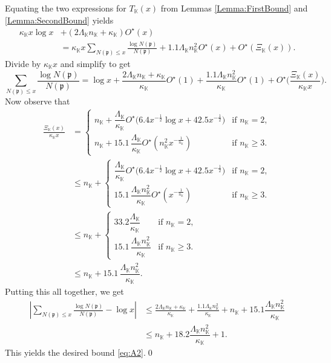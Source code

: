 \documentclass[10pt,reqno]{amsart}
\theoremstyle{plain}
\theoremstyle{definition}
\newcommand{\K}{\mathbb{K}}
\newcommand{\PP}{\mathfrak{p}}
\begin{document}
Equating the two expressions for $T_{\K}(x)$ from Lemmas \ref{Lemma:FirstBound} and \ref{Lemma:SecondBound} yields
\begin{align*}
\kappa_{\K} x\log x &+ (2\Lambda_{\K} n_{\K} +\kappa_{\K})O^{\star}(x)\\
&= \kappa_{\K} x \sum_{N(\PP)\leq x} \frac{\log{N(\PP)}}{N(\PP)} + 1.1 \Lambda_{\K}n_{\K}^2 
 O^{\star} (x) + O^{\star}(\Xi_{\K}(x)).
\end{align*}
Divide by $\kappa_{\K} x$ and simplify to get
\begin{equation*}
\sum_{N(\PP)\leq x} \frac{\log{N(\PP)}}{N(\PP)}
= \log x + \frac{2\Lambda_{\K} n_{\K} +\kappa_{\K}}{\kappa_{\K}}O^{\star}(1)
+ \frac{1.1 \Lambda_{\K}n_{\K}^2 
}{\kappa_{\K}} O^{\star} (1) + O^{\star}\bigg(\frac{\Xi_{\K}(x)}{\kappa_{\K}x}\bigg).
\end{equation*}
Now observe that
\begin{align*}
\frac{\Xi_{\K}(x)}{\kappa_{\K}x} 
&=
\begin{cases}
n_{\K}  + \dfrac{\Lambda_{\K}}{\kappa_{\K}} O^{\star} \big(6.4 x^{-\frac{1}{2}}\log x + 42.5 x^{ -\frac{1}{2} }   \big)  & \text{if $n_{\K} = 2$}, \\[5pt]
n_{\K}  + 15.1\, \dfrac{\Lambda_{\K}}{\kappa_{\K}} O^{\star}( n_{\K}^2 x^{ - \frac{1}{n_{\K}}}  )  & \text{if $n_{\K} \geq 3$}. 
\end{cases}
\\
&\leq n_{\K}+
\begin{cases}
\dfrac{\Lambda_{\K}}{\kappa_{\K}} O^{\star} \big(6.4 x^{-\frac{1}{2}}\log x + 42.5 x^{ -\frac{1}{2} }   \big)  & \text{if $n_{\K} = 2$}, \\[5pt]
15.1\, \dfrac{\Lambda_{\K} n_{\K}^2 }{\kappa_{\K}} O^{\star}( x^{ - \frac{1}{n_{\K}}}  )  & \text{if $n_{\K} \geq 3$}. 
\end{cases}
\\
&\leq n_{\K}+
\begin{cases}
33.2\dfrac{\Lambda_{\K}}{\kappa_{\K}}  & \text{if $n_{\K} = 2$}, \\[5pt]
15.1\, \dfrac{\Lambda_{\K}n_{\K}^2}{\kappa_{\K}}   & \text{if $n_{\K} \geq 3$}. 
\end{cases}
\\
&\leq n_{\K} + 15.1 \,  \dfrac{\Lambda_{\K}n_{\K}^2}{\kappa_{\K}} .
\end{align*}
Putting this all together, we get
\begin{align*}
\left|\sum_{N(\PP)\leq x} \frac{\log{N(\PP)}}{N(\PP)} - \log x\right|
&\leq 
 \frac{2\Lambda_{\K} n_{\K} +\kappa_{\K}}{\kappa_{\K}}
+ \frac{1.1 \Lambda_{\K}n_{\K}^2 }{\kappa_{\K}} 
+
n_{\K} + 15.1 \dfrac{\Lambda_{\K}n_{\K}^2}{\kappa_{\K}}\\
&\leq  n_{\K}  + 18.2 \dfrac{\Lambda_{\K}n_{\K}^2}{\kappa_{\K}} + 1.
\end{align*}
This yields the desired bound \eqref{eq:A2}.\qed
\end{document}
